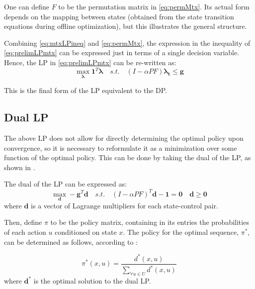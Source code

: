 \documentclass[conference]{IEEEtran}
\begin{document}
One can define $F$ to be the permutation matrix in \eqref{eq:permMtx}. Its actual form depends on the mapping between states (obtained from the state transition equations during offline optimization), but this illustrates the general structure.

Combining \eqref{eq:mtxLPineq} and \eqref{eq:permMtx}, the expression in the inequality of \eqref{eq:prelimLPmtx} can be expressed just in terms of a single decision variable. Hence, the LP in \eqref{eq:prelimLPmtx} can be re-written as:
\begin{equation} \label{eq:LPfinal}
    \max_{\boldsymbol{\lambda}} \boldsymbol{1}^{T} \boldsymbol{\lambda}
    \hspace{1em}s.t.\hspace{1em}
    (I-\alpha PF)\boldsymbol{\lambda_{t}} \leq \boldsymbol{g}
\end{equation}

This is the final form of the LP equivalent to the DP. %

\subsection{Dual LP}
The above LP does not allow for directly determining the optimal policy upon convergence, so it is necessary to reformulate it as a minimization over some function of the optimal policy. This can be done by taking the dual of the LP, as shown in \cite{4220813}.

The dual of the LP can be expressed as:
\begin{equation}
    \max_{\boldsymbol{d}} -\boldsymbol{g}^{T} \boldsymbol{d}
    \hspace{1em}s.t.\hspace{1em}(I-\alpha PF)^{T}\boldsymbol{d} - \boldsymbol{1} = \boldsymbol{0}\hspace{1em}\boldsymbol{d} \geq \boldsymbol{0}
\end{equation}
where $\boldsymbol{d}$ is a vector of Lagrange multipliers for each state-control pair.


Then, define $\pi$ to be the policy matrix, containing in its entries the probabilities of each action $u$ conditioned on state $x$. The policy for the optimal sequence, $\pi^{*}$, can be determined as follows, according to \cite{4220813}:

\begin{equation}
\pi^{*}(x,u)=\frac{d^{*}(x,u)}{\sum_{\forall u \in U}d^{*}(x,u)}
\end{equation} where $\boldsymbol{d^{*}}$ is the optimal solution to the dual LP.
\end{document}
